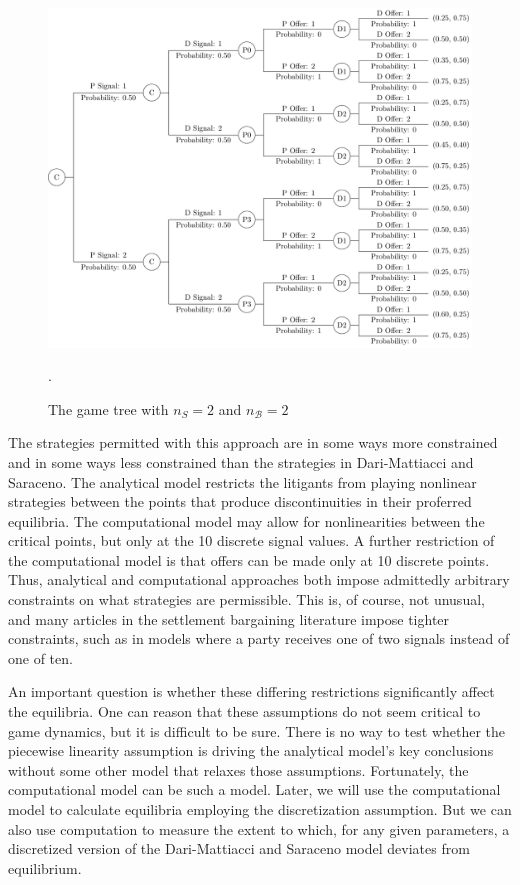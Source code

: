 \documentclass{article}
\begin{document}
\begin{figure}[h!]
\centering
\includegraphics[scale=0.50, trim={0in 0in 0in 0in}, clip]{../Figures/gametree.pdf}
\caption{The game tree with $n_S=2$ and $n_{\mathcal{B}}=2$}. 
\label{fig:gametree}
\end{figure}

The strategies permitted with this approach are in some ways more constrained and in some ways less constrained than the strategies in Dari-Mattiacci and Saraceno. The analytical model restricts the litigants from playing nonlinear strategies between the points that produce discontinuities in their proferred equilibria. The computational model may allow for nonlinearities between the critical points, but only at the 10 discrete signal values. A further restriction of the computational model is that offers can be made only at 10 discrete points. Thus, analytical and computational approaches both impose admittedly arbitrary constraints on what strategies are permissible. This is, of course, not unusual, and many articles in the settlement bargaining literature impose tighter constraints, such as in models where a party receives one of two signals instead of one of ten. 

An important question is whether these differing restrictions significantly affect the equilibria. One can reason that these assumptions do not seem critical to game dynamics, but it is difficult to be sure. There is no way to test whether the piecewise linearity assumption is driving the analytical model's key conclusions without some other model that relaxes those assumptions. Fortunately, the computational model can be such a model. Later, we will use the computational model to calculate equilibria employing the discretization assumption. But we can also use computation to measure the extent to which, for any given parameters, a discretized version of the Dari-Mattiacci and Saraceno model deviates from equilibrium. 
\end{document}
